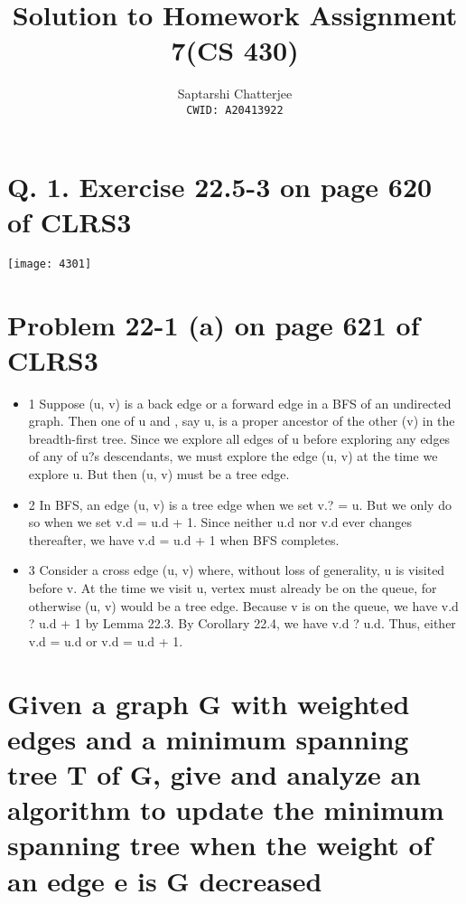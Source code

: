 \documentclass[5pt]{article}
\title{Solution to Homework Assignment 7(CS 430)}
\author{Saptarshi Chatterjee \\
\texttt{CWID: A20413922}
}
\begin{document}
\maketitle


\section{Q.  1. Exercise 22.5-3 on page 620 of CLRS3}

\setlength{\parskip}{1.2em}
\setlength{\parindent}{0em}

\texttt{[image: 4301]}

\section{Problem 22-1 (a) on page 621 of CLRS3}

\setlength{\parskip}{1.2em}
\setlength{\parindent}{0em}
\begin{itemize}
\item 1 Suppose (u, v) is a back edge or a forward edge in a BFS of an
undirected graph. Then one of u and , say u, is a proper ancestor
of the other (v) in the breadth-first tree. Since we explore all edges
of u before exploring any edges of any of u?s descendants, we must
explore the edge (u, v) at the time we explore u. But then (u, v) must
be a tree edge.\\
\item 2 In BFS, an edge (u, v) is a tree edge when we set v.? = u. But we
only do so when we set v.d = u.d + 1. Since neither u.d nor v.d ever
changes thereafter, we have v.d = u.d + 1 when BFS completes.\\
\item 3 Consider a cross edge (u, v) where, without loss of generality, u is
visited before v. At the time we visit u, vertex must already be on
the queue, for otherwise (u, v) would be a tree edge. Because v is on
the queue, we have v.d ? u.d + 1 by Lemma 22.3. By Corollary 22.4,
we have v.d ? u.d. Thus, either v.d = u.d or v.d = u.d + 1. \cite{hwprev}
\end{itemize}

\section{Given a graph G with weighted edges and a minimum spanning tree T of G, give and analyze an algorithm to update the minimum spanning tree when the weight of an edge e is G decreased}
\end{document}
